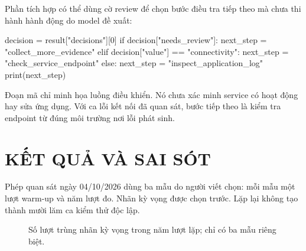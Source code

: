 \documentclass[10pt,a4paper]{article}
\begin{document}
Phần tích hợp có thể dùng cờ review để chọn bước điều tra tiếp theo mà chưa thi hành hành động do model đề xuất:
\begin{Code}
decision = result["decisions"][0]
if decision["needs_review"]:
    next_step = "collect_more_evidence"
elif decision["value"] == "connectivity":
    next_step = "check_service_endpoint"
else:
    next_step = "inspect_application_log"
print(next_step)
\end{Code}
Đoạn mã chỉ minh họa luồng điều khiển. Nó chưa xác minh service có hoạt động hay sửa ứng dụng. Với ca lỗi kết nối đã quan sát, bước tiếp theo là kiểm tra endpoint từ đúng môi trường nơi lỗi phát sinh.

\section{KẾT QUẢ VÀ SAI SÓT}
Phép quan sát ngày 04/10/2026 dùng ba mẫu do người viết chọn: mỗi mẫu một lượt warm-up và năm lượt đo. Nhãn kỳ vọng được chọn trước. Lặp lại không tạo thành mười lăm ca kiểm thử độc lập.

\begin{figure}[H]
\centering
{}
\caption{Số lượt trùng nhãn kỳ vọng trong năm lượt lặp; chỉ có ba mẫu riêng biệt.}
\end{figure}
\end{document}
